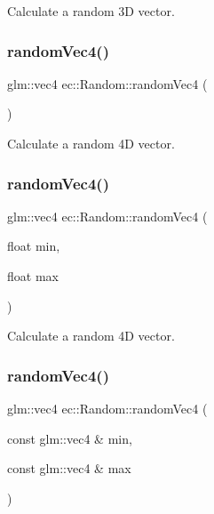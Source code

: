 Calculate a random 3D vector. \mbox{\label{classec_1_1_random_a14fae11ffad84de3a030d5f218192bcf}} 
\subsubsection{\texorpdfstring{random\+Vec4()}{randomVec4()}\hspace{0.1cm}{\footnotesize\ttfamily [1/3]}}
{\footnotesize\ttfamily glm\+::vec4 ec\+::\+Random\+::random\+Vec4 (\begin{DoxyParamCaption}{ }\end{DoxyParamCaption})\hspace{0.3cm}{\ttfamily [static]}}

Calculate a random 4D vector. \mbox{\label{classec_1_1_random_aaa2a5ec20d1e3c2b44e75ada89519982}} 
\subsubsection{\texorpdfstring{random\+Vec4()}{randomVec4()}\hspace{0.1cm}{\footnotesize\ttfamily [2/3]}}
{\footnotesize\ttfamily glm\+::vec4 ec\+::\+Random\+::random\+Vec4 (\begin{DoxyParamCaption}\item[{float}]{min,  }\item[{float}]{max }\end{DoxyParamCaption})\hspace{0.3cm}{\ttfamily [static]}}

Calculate a random 4D vector. \mbox{\label{classec_1_1_random_a27ef90c2ba082e044fb523dd2ecf66bf}} 
\subsubsection{\texorpdfstring{random\+Vec4()}{randomVec4()}\hspace{0.1cm}{\footnotesize\ttfamily [3/3]}}
{\footnotesize\ttfamily glm\+::vec4 ec\+::\+Random\+::random\+Vec4 (\begin{DoxyParamCaption}\item[{const glm\+::vec4 \&}]{min,  }\item[{const glm\+::vec4 \&}]{max }\end{DoxyParamCaption})\hspace{0.3cm}{\ttfamily [static]}}

